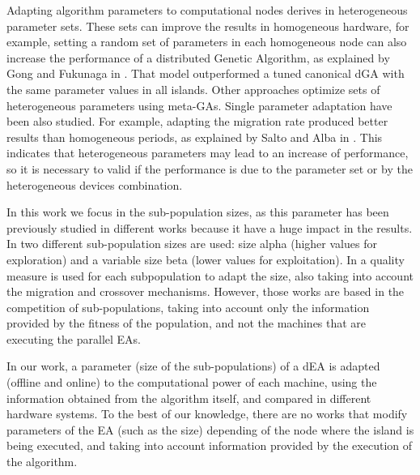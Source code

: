 \documentclass[final,1p,times]{elsarticle}
\begin{document}
Adapting algorithm parameters to computational nodes derives in heterogeneous parameter sets. These sets can improve the results in homogeneous hardware, for example, setting a random set of parameters in each homogeneous node can also increase the
performance of a distributed Genetic Algorithm, as explained by Gong
and Fukunaga in \cite{HETEROGENEOUSPARAMETERS}. That model
outperformed a tuned canonical dGA with the same parameter values in
all islands. Other approaches \cite{ParallelGATongchim02,PanaceasClune05} optimize sets of heterogeneous parameters using meta-GAs. Single parameter adaptation have been also studied. For example, adapting the migration rate produced better
results than homogeneous periods, as explained by Salto and Alba in
\cite{HETEROGENEOUSMIGRATION}. This indicates that heterogeneous parameters
 may lead to an increase of performance, so it is necessary to valid if the 
 performance is due to the parameter set or by the heterogeneous devices combination.



In this work we focus in the sub-population sizes, as this parameter has been previously studied in different works because it have a huge impact in the results. In \cite{DifferentialWeber09} two different sub-population sizes are used: size alpha (higher values for exploration) and a variable size beta (lower values for exploitation). In \cite{AdaptationSizesSchlierkamp96} a quality measure is used for each subpopulation to adapt the size, also taking into account the migration and crossover mechanisms. However, those works are based in the competition of sub-populations, taking into account only the information provided by the fitness of the population, and not the machines that are executing the parallel EAs.

In our work, a parameter (size of the sub-populations) of a dEA is adapted (offline and online) to the computational power of each machine, using the information obtained from the algorithm itself, and compared in different hardware systems.
 To the best of our knowledge, there are no works that
 modify parameters of the EA (such as the size) depending of the
 node where the island is being executed, and taking into account information provided by the execution of the algorithm. 
\end{document}
